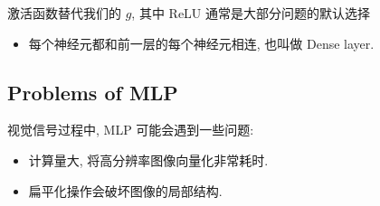 \begin{note}
激活函数替代我们的 $g$, 其中 ReLU 通常是大部分问题的默认选择
\end{note}

\begin{definition}
    \begin{itemize}
        \item 每个神经元都和前一层的每个神经元相连, 也叫做 Dense layer.
    \end{itemize}
\end{definition}

\subsection{Problems of MLP}
视觉信号过程中, MLP 可能会遇到一些问题:
\begin{itemize}
    \item 计算量大, 将高分辨率图像向量化非常耗时.
    \item 扁平化操作会破坏图像的局部结构.
\end{itemize}